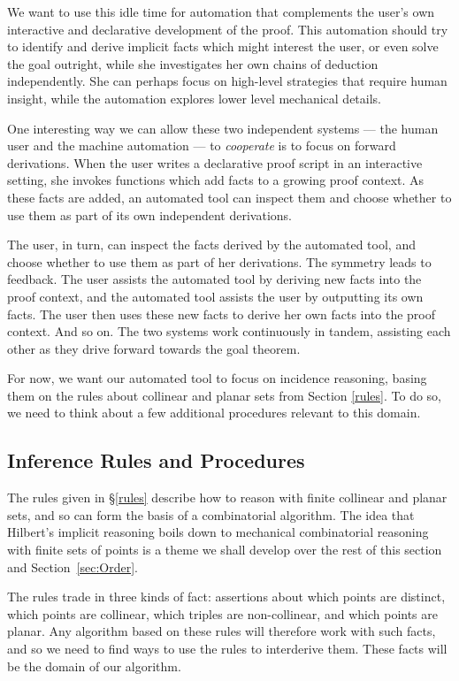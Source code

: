 We want to use this idle time for automation that complements the user's own interactive and declarative development of the proof. This automation should try to identify and derive implicit facts which might interest the user, or even solve the goal outright, while she investigates her own chains of deduction independently. She can perhaps focus on high-level strategies that require human insight, while the automation explores lower level mechanical details.

One interesting way we can allow these two independent systems --- the human user and the machine automation --- to \emph{cooperate} is to focus on forward derivations. When the user writes a declarative proof script in an interactive setting, she invokes functions which add facts to a growing proof context. As these facts are added, an automated tool can inspect them and choose whether to use them as part of its own independent derivations. 

The user, in turn, can inspect the facts derived by the automated tool, and choose whether to use them as part of her derivations. The symmetry leads to feedback. The user assists the automated tool by deriving new facts into the proof context, and the automated tool assists the user by outputting its own facts. The user then uses these new facts to derive her own facts into the proof context. And so on. The two systems work continuously in tandem, assisting each other as they drive forward towards the goal theorem.

For now, we want our automated tool to focus on incidence reasoning, basing them on the rules about collinear and planar sets from Section \ref{rules}. To do so, we need to think about a few additional procedures relevant to this domain.

\subsection{Inference Rules and Procedures}
The rules given in \S\ref{rules} describe how to reason with finite collinear and planar sets, and so can form the basis of a combinatorial algorithm. The idea that Hilbert's implicit reasoning boils down to mechanical combinatorial reasoning with finite sets of points is a theme we shall develop over the rest of this section and Section~\ref{sec:Order}. 

The rules trade in three kinds of fact: assertions about which points are distinct, which points are collinear, which triples are non-collinear, and which points are planar. Any algorithm based on these rules will therefore work with such facts, and so we need to find ways to use the rules to interderive them. These facts will be the domain of our algorithm.

